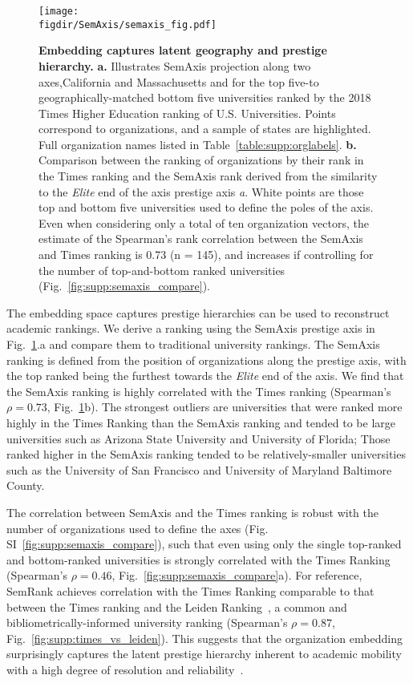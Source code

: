 \documentclass[12pt]{article} %
\def\figdir{../Figs}
\begin{document}
%
%
\begin{figure}[hp!]
	\centering
	\texttt{[image: \\figdir/SemAxis/semaxis\_fig.pdf]}
	\caption{
		\textbf{Embedding captures latent geography and prestige hierarchy.}
		\textbf{a.} Illustrates SemAxis projection along two axes,California and Massachusetts and for the top five-to geographically-matched bottom five universities ranked by the 2018 Times Higher Education ranking of U.S. Universities.
		Points correspond to organizations, and a sample of states are highlighted.
		Full organization names listed in Table~\ref{table:supp:orglabels}.
		\textbf{b.} Comparison between the ranking of organizations by their rank in the Times ranking and the SemAxis rank derived from the similarity to the \textit{Elite} end of the axis prestige axis \textit{a}.
		White points are those top and bottom five universities used to define the poles of the axis.
	  	Even when considering only a total of ten organization vectors, the estimate of the Spearman's rank correlation between the SemAxis and Times ranking is 0.73 (n = 145), and increases if controlling for the number of top-and-bottom ranked universities (Fig.~\ref{fig:supp:semaxis_compare}).
	}
	\label{fig:semaxis}
\end{figure}


The embedding space captures prestige hierarchies can be used to reconstruct academic rankings. 
We derive a ranking using the SemAxis prestige axis in Fig.~\ref{fig:semaxis}.a and compare them to traditional university rankings.
The SemAxis ranking is defined from the position of organizations along the prestige axis, with the top ranked being the furthest towards the \textit{Elite} end of the axis.
We find that the SemAxis ranking is highly correlated with the Times ranking (Spearman's $\rho = 0.73$, Fig.~\ref{fig:semaxis}b).
The strongest outliers are universities that were ranked more highly in the Times Ranking than the SemAxis ranking and tended to be large universities such as Arizona State University and  University of Florida;
Those ranked higher in the SemAxis ranking tended to be relatively-smaller universities such as the University of San Francisco and University of Maryland Baltimore County.

The correlation between SemAxis and the Times ranking is robust with the number of organizations used to define the axes (Fig. SI~\ref{fig:supp:semaxis_compare}), such that even using only the single top-ranked and bottom-ranked universities is strongly correlated with the Times Ranking (Spearman's $\rho = 0.46$, Fig.~\ref{fig:supp:semaxis_compare}a).
For reference, SemRank achieves correlation with the Times Ranking comparable to that between the Times ranking and the Leiden Ranking~\autocite{waltman2012leidenrankings}, a common and bibliometrically-informed university ranking (Spearman's $\rho = 0.87$, Fig.~\ref{fig:supp:times_vs_leiden}).
This suggests that the organization embedding surprisingly captures the latent prestige hierarchy inherent to academic mobility with a high degree of resolution and reliability~\autocite{deville2014career, clauset2015hierarchy}. 
\end{document}
